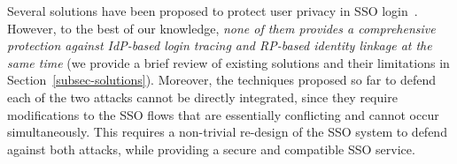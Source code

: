 
Several solutions have been proposed to protect user privacy in SSO login~\cite{maler2008venn,NIST2017draft,BrowserID,SPRESSO}. However, to the best of our knowledge, {\em none of them provides a comprehensive protection against IdP-based login tracing and RP-based identity linkage at the same time} (we provide a brief review of existing solutions and their limitations in Section~\ref{subsec-solutions}). Moreover, the techniques proposed so far to defend each of the two attacks cannot be directly integrated, since they require modifications to the SSO flows that are essentially conflicting and cannot occur simultaneously. This requires a non-trivial re-design of the SSO system to defend against both attacks, 
while providing a secure and compatible SSO service. 

